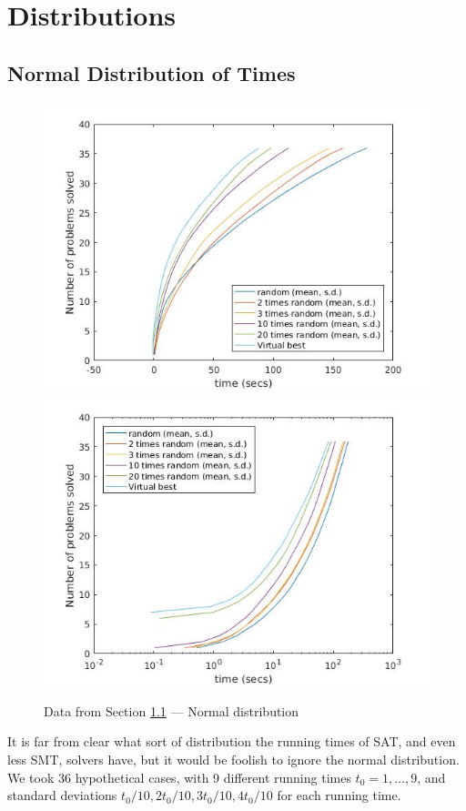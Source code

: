 \documentclass{easychair}
\begin{document}
\section{Distributions}
\subsection{Normal Distribution of Times}\label{sec:Normal}
\begin{figure}[h]
\caption{Data from Section \ref{sec:Normal} --- Normal distribution\label{Fig:Normal}}
\includegraphics[scale=0.4]{RSolve20.jpg}
\includegraphics[scale=0.4]{RlogSolve20.jpg}
\end{figure}
It is far from clear what sort of distribution the running times of SAT, and even less SMT, solvers have, but it would be foolish to ignore the normal distribution. We took 36 hypothetical cases, with 9 different running times $t_0=1,\ldots,9$, and standard deviations $t_0/10,2t_0/10,3t_0/10,4t_0/10$ for each running time.
\end{document}
